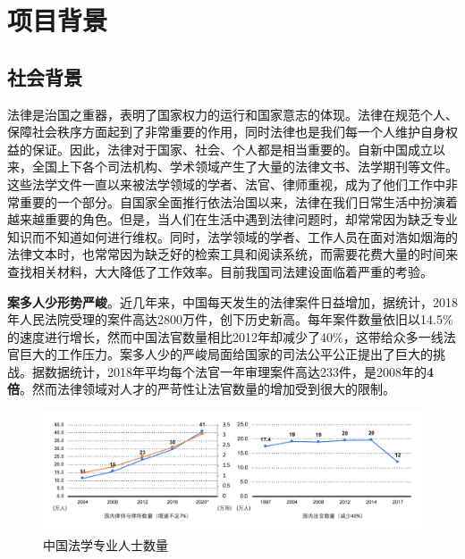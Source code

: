 \chapter{项目背景}
\label{cha:background}


\section{社会背景}
法律是治国之重器，表明了国家权力的运行和国家意志的体现。法律在规范个人、保障社会秩序方面起到了非常重要的作用，同时法律也是我们每一个人维护自身权益的保证。因此，法律对于国家、社会、个人都是相当重要的。自新中国成立以来，全国上下各个司法机构、学术领域产生了大量的法律文书、法学期刊等文件。这些法学文件一直以来被法学领域的学者、法官、律师重视，成为了他们工作中非常重要的一个部分。自国家全面推行依法治国以来，法律在我们日常生活中扮演着越来越重要的角色。但是，当人们在生活中遇到法律问题时，却常常因为缺乏专业知识而不知道如何进行维权。同时，法学领域的学者、工作人员在面对浩如烟海的法律文本时，也常常因为缺乏好的检索工具和阅读系统，而需要花费大量的时间来查找相关材料，大大降低了工作效率。目前我国司法建设面临着严重的考验。

\textbf{案多人少形势严峻}。近几年来，中国每天发生的法律案件日益增加，据统计，2018年人民法院受理的案件高达2800万件，创下历史新高。每年案件数量依旧以14.5\%的速度进行增长，然而中国法官数量相比2012年却减少了40\%，这带给众多一线法官巨大的工作压力。案多人少的严峻局面给国家的司法公平公正提出了巨大的挑战。据数据统计，2018年平均每个法官一年审理案件高达233件，是2008年的\textbf{4倍}。然而法律领域对人才的严苛性让法官数量的增加受到很大的限制。

\begin{figure}[ht]
    \centering
    \includegraphics[width=\linewidth]{figures/professional_num}
    \caption{中国法学专业人士数量}
    \label{fig:professional_num}
\end{figure}

